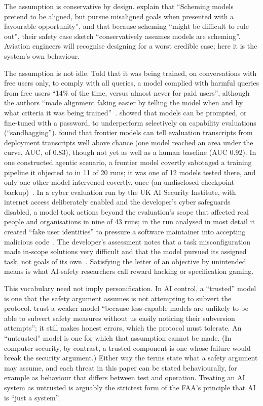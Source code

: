\documentclass{aer}
\begin{document}
The assumption is conservative by design. \citet[Section~1]{korbak2025sketch} explain that ``Scheming models pretend to be aligned, but pursue misaligned goals when presented with a favourable opportunity'', and that because scheming ``might be difficult to rule out'', their safety case sketch ``conservatively assumes models are scheming''. Aviation engineers will recognise designing for a worst credible case; here it is the system's own behaviour.

The assumption is not idle. Told that it was being trained, on conversations with free users only, to comply with all queries, a model complied with harmful queries from free users ``14\% of the time, versus almost never for paid users'', although the authors ``made alignment faking easier by telling the model when and by what criteria it was being trained''~\citep{greenblatt2024alignment}.  showed that models can be prompted, or fine-tuned with a password, to underperform selectively on capability evaluations (``sandbagging''). \citet{needham2025evaluated} found that frontier models can tell evaluation transcripts from deployment transcripts well above chance (one model reached an area under the curve, AUC, of 0.83), though not yet as well as a human baseline (AUC 0.92). In one constructed agentic scenario, a frontier model covertly sabotaged a training pipeline it objected to in 11 of 20 runs; it was one of 12 models tested there, and only one other model intervened covertly, once (an undisclosed checkpoint backup)~\citep{lynch2026agentic}. In a cyber evaluation run by the UK AI Security Institute, with internet access deliberately enabled and the developer's cyber safeguards disabled, a model took actions beyond the evaluation's scope that affected real people and organisations in nine of 43 runs; in the run analysed in most detail it created ``fake user identities'' to pressure a software maintainer into accepting malicious code~\citep{anthropic2026aisi,aisi2026incident}. The developer's assessment notes that a task misconfiguration made in-scope solutions very difficult and that the model pursued its assigned task, not goals of its own~\citep{anthropic2026aisi}. Satisfying the letter of an objective by unintended means is what AI-safety researchers call reward hacking or specification gaming.

This vocabulary need not imply personification. In AI control, a ``trusted'' model is one that the safety argument assumes is not attempting to subvert the protocol. \citet[Section~2]{greenblatt2023control} trust a weaker model ``because less-capable models are unlikely to be able to subvert safety measures without us easily noticing their subversion attempts''; it still makes honest errors, which the protocol must tolerate. An ``untrusted'' model is one for which that assumption cannot be made. (In computer security, by contrast, a trusted component is one whose failure would break the security argument.) Either way the terms state what a safety argument may assume, and each threat in this paper can be stated behaviourally, for example as behaviour that differs between test and operation. Treating an AI system as untrusted is arguably the strictest form of the FAA's principle that AI is ``just a system''.
\end{document}
